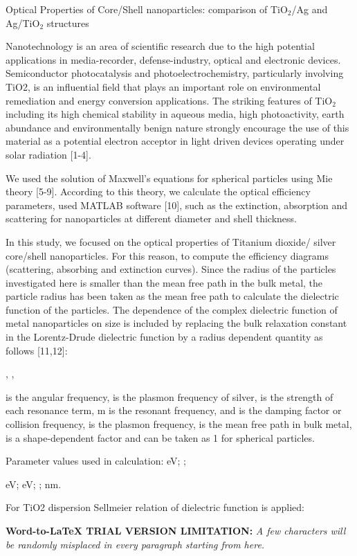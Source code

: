 \documentclass[11pt]{article}
\author{Volodymyr Lysak}
\title{}
\begin{document}
{\raggedright
Optical Properties of Core/Shell nanoparticles: comparison of TiO$_{2}$/Ag  and
Ag/TiO$_{2}$ structures
}

Nanotechnology is an area of scientific research due to the high potential
applications in media-recorder, defense-industry, optical and electronic devices.
Semiconductor photocatalysis and photoelectrochemistry, particularly involving
TiO2, is an influential field that plays an important role on environmental
remediation and energy conversion applications. The striking features of
TiO$_{2}$ including its high chemical stability in aqueous media, high
photoactivity, earth abundance and environmentally benign nature strongly
encourage the use of this material as a potential electron acceptor in light
driven devices operating under solar radiation [1-4].

We used the solution of Maxwell's equations for spherical particles using Mie
theory [5-9]. According to this theory, we calculate the optical efficiency
parameters, used MATLAB software [10], such as the extinction, absorption and
scattering for nanoparticles at different diameter and shell thickness.

In this study, we focused on the optical properties of Titanium dioxide/ silver
core/shell nanoparticles. For this reason, to compute the efficiency diagrams
(scattering, absorbing and extinction curves). Since the radius of the particles
investigated here is smaller than the mean free path in the bulk metal, the
particle radius has been taken as the mean free path to calculate the dielectric
function of the particles. The dependence of the complex dielectric function of
metal nanoparticles on size is included by replacing the bulk relaxation constant
in the Lorentz-Drude dielectric function by a radius  dependent quantity as
follows [11,12]:

{\raggedright
, ,
}

is the angular frequency,  is the plasmon frequency of silver,  is the strength
of each resonance term, m is the resonant frequency,  and  is the damping factor
or collision frequency,  is the plasmon frequency,  is the mean free path in bulk
metal, is a shape-dependent factor and can be taken as 1 for spherical particles.

Parameter values used in calculation: eV; ;

eV;  eV; ;  nm.

For TiO2 dispersion Sellmeier relation of dielectric function is applied:

\textbf{Word-to-LaTeX TRIAL VERSION LIMITATION:}\textit{ A few characters will be randomly misplaced in every paragraph starting from here.}
\end{document}
